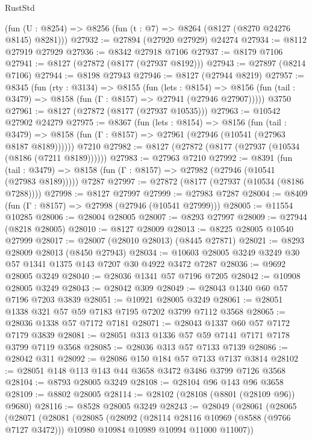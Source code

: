 \begin{lexlean}{RustStd}
\begin{coremodule}
    (fun (U : @8254) => @8256 (fun (t : @7) => @8264 (@8127 (@8270 @24276 @8145) @8281)))
@27932 := @27894 (@27920 @27929) @24274
@27934 := @8112 @27919 @27929
@27936 := @8342 @27918 @7106
@27937 := @8179 @7106
@27941 := @8127 (@27872 (@8177 (@27937 @8192)))
@27943 := @27897 (@8214 @7106)
@27944 := @8198 @27943
@27946 := @8127 (@27944 @8219)
@27957 := @8345
    (fun (rty : @3134) =>
    @8155
      (fun (lets : @8154) =>
      @8156 (fun (tail : @3479) => @8158 (fun (Γ : @8157) => @27941 (@27946 @27907)))))
    @3750
@27961 := @8127 (@27872 (@8177 (@27937 @10535)))
@27963 := @10542 @27902 @24279
@27975 := @8367
    (fun (lets : @8154) =>
    @8156
      (fun (tail : @3479) =>
      @8158 (fun (Γ : @8157) => @27961 (@27946 (@10541 (@27963 @8187 @8189))))))
    @7210
@27982 := @8127 (@27872 (@8177 (@27937 (@10534 (@8186 (@7211 @8189))))))
@27983 := @27963 @7210
@27992 := @8391
    (fun (tail : @3479) => @8158 (fun (Γ : @8157) => @27982 (@27946 (@10541 (@27983 @8189)))))
    @7287
@27997 := @27872 (@8177 (@27937 (@10534 (@8186 @7288))))
@27998 := @8127 @27997
@27999 := @27983 @7287
@28004 := @8409 (fun (Γ : @8157) => @27998 (@27946 (@10541 @27999)))
@28005 := @11554 @10285
@28006 := @28004 @28005
@28007 := @8293 @27997
@28009 := @27944 (@8218 @28005)
@28010 := @8127 @28009
@28013 := @8225 @28005 @10540 @27999
@28017 := @28007 (@28010 @28013) (@8445 @27871)
@28021 := @8293 @28009 @28013 (@8450 @27943)
@28034 := @10603 @28005 @3249 @3249 @30 @57 @1341 @1375 @143 @7207 @30 @4922 @3472 @7287
@28036 := @9692 @28005 @3249
@28040 := @28036 @1341 @57 @7196 @7205
@28042 := @10908 @28005 @3249
@28043 := @28042 @309
@28049 := @28043 @1340 @60 @57 @7196 @7203 @3839
@28051 := @10921 @28005 @3249
@28061 := @28051 @1338 @321 @57 @59 @7183 @7195 @7202 @3799 @7112 @3568
@28065 := @28036 @1338 @57 @7172 @7181
@28071 := @28043 @1337 @60 @57 @7172 @7179 @3839
@28081 := @28051 @313 @1336 @57 @59 @7141 @7171 @7178 @3799 @7119 @3568
@28085 := @28036 @313 @57 @7133 @7139
@28086 := @28042 @311
@28092 := @28086 @150 @184 @57 @7133 @7137 @3814
@28102 := @28051 @148 @113 @143 @44 @3658 @3472 @3486 @3799 @7126 @3568
@28104 := @8793 @28005 @3249
@28108 := @28104 @96 @143 @96 @3658
@28109 := @8802 @28005
@28114 := @28102 (@28108 (@8801 (@28109 @96)) @9680)
@28116 := @8528 @28005 @3249
@28243 := @28049
    (@28061
      (@28065
        (@28071
          (@28081
            (@28085
              (@28092
                (@28114 @28116 @10969 (@8588 (@9766 @7127 @3472)))
                @10980
                @10984
                @10989
                @10994
                @11000
                @11007))

\end{coremodule}
\end{lexlean}
